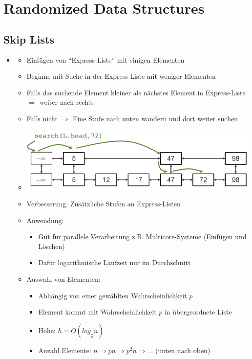 \documentclass[
    12pt,
    a4paper,
    ngerman,
    color=3b,%
    marginpar=false,
    colorback=false,
    leqno,
]{tudaexercise}
\begin{document}
\section{Randomized Data Structures}\label{Randomized Data Structures}
\subsection{Skip Lists}\label{Skip Lists}
    \begin{itemize}
        \item {}
            \begin{itemize}
                \item Einfügen von "`Express-Liste"' mit einigen Elementen
                \item Beginne mit Suche in der Express-Liste mit weniger Elementen
                \item Falls das suchende Element kleiner als nächstes Element in Express-Liste $\Rightarrow$ weiter nach rechts
                \item Falls nicht $\Rightarrow$ Eine Stufe nach unten wandern und dort weiter suchen
                \item[] \includegraphics[width=12cm]{pictures/skiplistSuche.PNG}
                \item Verbesserung: Zusätzliche Stufen an Express-Listen 
                \item Anwendung: 
                \begin{itemize}
                    \item Gut für parallele Verarbeitung z.B. Multicore-Systeme (Einfügen und Löschen)
                    \item Dafür logarithmische Laufzeit nur im Durchschnitt
                \end{itemize}
                \item Auswahl von Elementen:
                    \begin{itemize}
                        \item Abhängig von einer gewählten Wahrscheinlichkeit $p$ 
                        \item Element kommt mit Wahrscheinlichkeit $p$ in übergeordnete Liste
                        \item Höhe: $h = O(log_{\frac{1}{p}}n)$
                        \item Anzahl Elemente: $n \Rightarrow pn \Rightarrow p^2n \Rightarrow ...$ (unten nach oben)
                    \end{itemize}
            \end{itemize}


\end{itemize}
\end{document}
